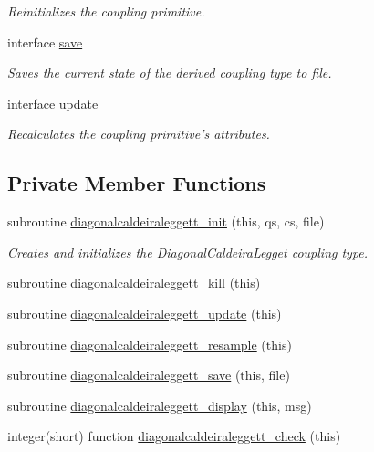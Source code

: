 \begin{DoxyCompactItemize}
\begin{DoxyCompactList}\small\item\em Reinitializes the coupling primitive. \end{DoxyCompactList}\item 
interface \hyperlink{interfacediagonalcaldeiraleggett__class_1_1save}{save}
\begin{DoxyCompactList}\small\item\em Saves the current state of the derived coupling type to file. \end{DoxyCompactList}\item 
interface \hyperlink{interfacediagonalcaldeiraleggett__class_1_1update}{update}
\begin{DoxyCompactList}\small\item\em Recalculates the coupling primitive's attributes. \end{DoxyCompactList}\end{DoxyCompactItemize}
\subsection*{Private Member Functions}
\begin{DoxyCompactItemize}
\item 
subroutine \hyperlink{classdiagonalcaldeiraleggett__class_a77a4b59596281583000705c1aed66876}{diagonalcaldeiraleggett\+\_\+init} (this, qs, cs, file)
\begin{DoxyCompactList}\small\item\em Creates and initializes the Diagonal\+Caldeira\+Legget coupling type. \end{DoxyCompactList}\item 
subroutine \hyperlink{classdiagonalcaldeiraleggett__class_a0d2ff90e3d5b6fe8f39efb94fbe8b69e}{diagonalcaldeiraleggett\+\_\+kill} (this)
\item 
subroutine \hyperlink{classdiagonalcaldeiraleggett__class_a7d2be81a6936c89b00a36e6ded7bd9a8}{diagonalcaldeiraleggett\+\_\+update} (this)
\item 
subroutine \hyperlink{classdiagonalcaldeiraleggett__class_a7247bcb797125177687611a7fb58a0ae}{diagonalcaldeiraleggett\+\_\+resample} (this)
\item 
subroutine \hyperlink{classdiagonalcaldeiraleggett__class_aa98c2c7a65adcda966ad7c8e9b7b0558}{diagonalcaldeiraleggett\+\_\+save} (this, file)
\item 
subroutine \hyperlink{classdiagonalcaldeiraleggett__class_acdd94a8e0e2bd6467a3e09fdeb3ce3bf}{diagonalcaldeiraleggett\+\_\+display} (this, msg)
\item 
integer(short) function \hyperlink{classdiagonalcaldeiraleggett__class_aafa02474c975bce12990f64ad6f9a89b}{diagonalcaldeiraleggett\+\_\+check} (this)
\end{DoxyCompactItemize}


